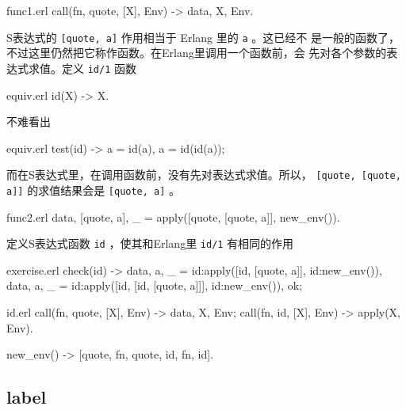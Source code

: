 \documentclass[preview,multi,crop=false,border=1in,class=memoir]{standalone}
\begin{document}
\begin{preview-page}
\begin{SourceCode}[24][25]{func1.erl}
call({fn, quote}, [X], Env) ->
    {{data, X}, Env}.
\end{SourceCode}

S表达式的 \verb|[quote, a]| 作用相当于 Erlang 里的 \verb|a| 。这已经不
是一般的函数了，不过这里仍然把它称作函数。在Erlang里调用一个函数前，会
先对各个参数的表达式求值。定义 \verb|id/1| 函数

\begin{SourceCode}[6][7]{equiv.erl}
id(X) ->
    X.
\end{SourceCode}

不难看出

\begin{SourceCode}[14][16]{equiv.erl}
test(id) ->
    a = id(a),
    a = id(id(a));
\end{SourceCode}

而在S表达式里，在调用函数前，没有先对表达式求值。所以，
\verb|[quote, [quote, a]]| 的求值结果会是 \verb|[quote, a]| 。

\begin{SourceCode}[41][42]{func2.erl}
    {{data, [quote, a]}, _} =
        apply([quote, [quote, a]], new_env()).
\end{SourceCode}


\begin{Exercise}[title={id},difficulty=1]
定义S表达式函数 \verb|id| ，使其和Erlang里 \verb|id/1| 有相同的作用

\begin{SourceCode}[21][26]{exercise.erl}
check(id) ->
    {{data, a}, _} =
        id:apply([id, [quote, a]], id:new_env()),
    {{data, a}, _} =
        id:apply([id, [id, [quote, a]]], id:new_env()),
    ok;
\end{SourceCode}

\end{Exercise}

\begin{Answer}
\begin{SourceCode}[24][32]{id.erl}
call({fn, quote}, [X], Env) ->
    {{data, X}, Env};
call({fn, id}, [X], Env) ->
    apply(X, Env).


new_env() ->
    [{quote, {fn, quote}},
     {id,    {fn, id}}].
\end{SourceCode}
\end{Answer}


\subsection{label}


\end{preview-page}
\end{document}
